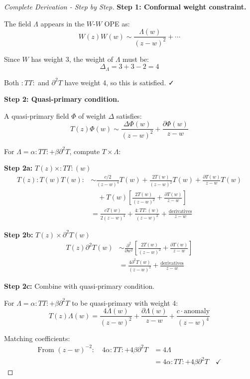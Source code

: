 \begin{proof}[Complete Derivation - Step by Step]

\textbf{Step 1: Conformal weight constraint.}

The field $\Lambda$ appears in the $W$-$W$ OPE as:
$$W(z)W(w) \sim \frac{\Lambda(w)}{(z-w)^2} + \cdots$$

Since $W$ has weight 3, the weight of $\Lambda$ must be:
$$\Delta_\Lambda = 3 + 3 - 2 = 4$$

Both $:TT:$ and $\partial^2 T$ have weight 4, so this is satisfied. ✓

\textbf{Step 2: Quasi-primary condition.}

A quasi-primary field $\Phi$ of weight $\Delta$ satisfies:
$$T(z)\Phi(w) \sim \frac{\Delta \Phi(w)}{(z-w)^2} + \frac{\partial\Phi(w)}{z-w}$$

For $\Lambda = \alpha :TT: + \beta \partial^2 T$, compute $T \times \Lambda$:

\textbf{Step 2a:} $T(z) \times :TT:(w)$
\begin{align}
T(z) :T(w)T(w): &\sim \frac{c/2}{(z-w)^4} T(w) + \frac{2T(w)}{(z-w)^2} T(w) 
+ \frac{\partial T(w)}{z-w} T(w) \\
&\quad + T(w) \left[\frac{2T(w)}{(z-w)^2} + \frac{\partial T(w)}{z-w}\right] \\
&= \frac{c T(w)}{2(z-w)^4} + \frac{4 :TT:(w)}{(z-w)^2} 
+ \frac{\text{derivatives}}{z-w}
\end{align}

\textbf{Step 2b:} $T(z) \times \partial^2 T(w)$
\begin{align}
T(z) \partial^2 T(w) &\sim \frac{\partial^2}{\partial w^2}\left[\frac{2T(w)}{(z-w)^2} 
+ \frac{\partial T(w)}{z-w}\right] \\
&= \frac{4\partial^2 T(w)}{(z-w)^2} + \frac{\text{derivatives}}{z-w}
\end{align}

\textbf{Step 2c:} Combine with quasi-primary condition.

For $\Lambda = \alpha :TT: + \beta \partial^2 T$ to be quasi-primary with weight 4:
$$T(z)\Lambda(w) = \frac{4\Lambda(w)}{(z-w)^2} + \frac{\partial\Lambda(w)}{z-w} 
+ \frac{c \cdot \text{anomaly}}{(z-w)^4}$$

Matching coefficients:
\begin{align}
\text{From } (z-w)^{-2}: \quad 4\alpha :TT: + 4\beta \partial^2 T &= 4\Lambda \\
&= 4\alpha :TT: + 4\beta \partial^2 T \quad \checkmark
\end{align}


\end{proof}
